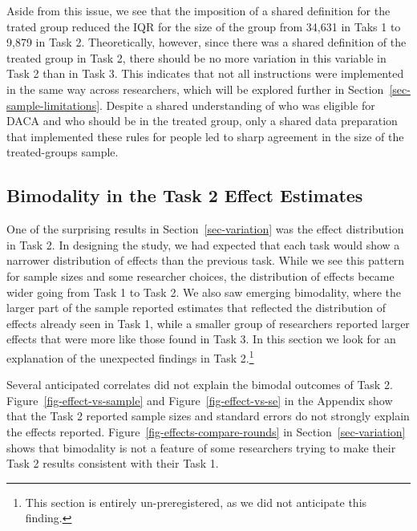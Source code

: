 \documentclass[
  letterpaper,
  DIV=11,
  numbers=noendperiod]{scrartcl}
\begin{document}
Aside from this issue, we see that the imposition of a shared definition
for the trated group reduced the IQR for the size of the group from
34,631 in Taks 1 to 9,879 in Task 2. Theoretically, however, since there
was a shared definition of the treated group in Task 2, there should be
no more variation in this variable in Task 2 than in Task 3. This
indicates that not all instructions were implemented in the same way
across researchers, which will be explored further in
Section~\ref{sec-sample-limitations}. Despite a shared understanding of
who was eligible for DACA and who should be in the treated group, only a
shared data preparation that implemented these rules for people led to
sharp agreement in the size of the treated-groups sample.

\hypertarget{sec-bimodal}{%
\subsection{Bimodality in the Task 2 Effect
Estimates}\label{sec-bimodal}}

One of the surprising results in Section~\ref{sec-variation} was the
effect distribution in Task 2. In designing the study, we had expected
that each task would show a narrower distribution of effects than the
previous task. While we see this pattern for sample sizes and some
researcher choices, the distribution of effects became wider going from
Task 1 to Task 2. We also saw emerging bimodality, where the larger part
of the sample reported estimates that reflected the distribution of
effects already seen in Task 1, while a smaller group of researchers
reported larger effects that were more like those found in Task 3. In
this section we look for an explanation of the unexpected findings in
Task 2.\footnote{This section is entirely un-preregistered, as we did
  not anticipate this finding.}

Several anticipated correlates did not explain the bimodal outcomes of
Task 2. Figure~\ref{fig-effect-vs-sample} and
Figure~\ref{fig-effect-vs-se} in the Appendix show that the Task 2
reported sample sizes and standard errors do not strongly explain the
effects reported. Figure~\ref{fig-effects-compare-rounds} in
Section~\ref{sec-variation} shows that bimodality is not a feature of
some researchers trying to make their Task 2 results consistent with
their Task 1.
\end{document}
